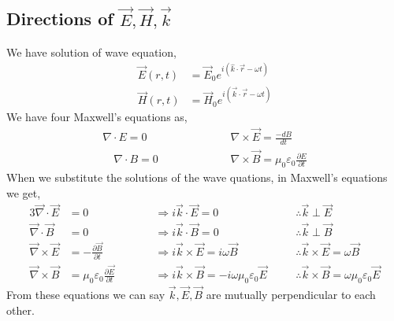 \subsection{Directions of $\vec{E}, \vec{H}, \vec{k}$}
We have solution of wave equation,
\begin{align*}
\vec{E}(r, t)&=\vec{E}_{0} e^{i(\hat{k} \cdot \vec{r}-\omega t)} \\
\vec{H}(r, t)&=\vec{H}_{0} e^{i(\vec{k} \cdot \vec{r}-\omega t)}
\end{align*}
We have four Maxwell's equations as,
\begin{align*}
\nabla\cdot E=0&\hspace{2cm}\quad \nabla\times\vec{E}=\frac{-dB}{dt}\\
\quad \nabla\cdot B=0&\hspace{2cm} \quad \nabla\times\vec{B}=\mu_{0}\varepsilon_0\frac{\partial E}{\partial t}
\end{align*}
When we substitute the solutions of the wave quations, in Maxwell's equations we get,
\begin{alignat*}{3}
\vec{\nabla} \cdot \vec{E}&=0 \qquad &&\Rightarrow i \vec{k} \cdot \vec{E}=0 && \therefore \vec{k} \perp \vec{E} \\
\vec{\nabla} \cdot \vec{B}&=0 \qquad &&\Rightarrow i \vec{k} \cdot \vec{B}=0 && \therefore \vec{k} \perp \vec{B} \\
\vec{\nabla} \times \vec{E}&=-\frac{\partial \vec{B}}{\partial t} \qquad && \Rightarrow i \vec{k} \times \vec{E}=i \omega  \vec{B} \quad&& \therefore \vec{k} \times \vec{E}=\omega  \vec{B} \\
\vec{\nabla} \times \vec{B}&=\mu_{0}\varepsilon_{0} \frac{\partial \vec{E}}{\partial t}\qquad  &&\Rightarrow i \vec{k} \times \vec{B}=-i \omega \mu_{0}\varepsilon_{0} \vec{E} \quad &&\therefore \vec{k} \times \vec{B}=\omega \mu_{0}\varepsilon_{0} \vec{E}
\end{alignat*}
From these equations we can say $\vec{k}, \vec{E}, \vec{B}$ are mutually perpendicular to each other.


